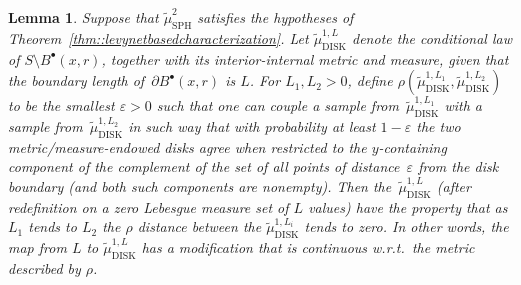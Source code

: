 \documentclass[10pt]{amsart}
\newcommand{\sbullet}{{\scriptscriptstyle\bullet}}
\let\epsilon\varepsilon
\theoremstyle{plain}
\numberwithin{theorem}{section}
\newtheorem{lemma}[theorem]{Lemma}
\theoremstyle{definition}
\newcommand{\tmustwo}{\wt{\mu}_{\mathrm{SPH}}^2}
\newcommand{\tmudonel}{\wt{\mu}_{ \mathrm{DISK}}^{1, L}}
\def\tmudonelset#1{\wt{\mu}_{ \mathrm{DISK}}^{1, #1}}
\let\wt\widetilde
\newcommand{\fb}[2]{B^\sbullet(#1,#2)}
\begin{document}
\begin{lemma}
\label{lem::disklawcontinuity}
Suppose that $\tmustwo$ satisfies the hypotheses of Theorem~\ref{thm::levynetbasedcharacterization}. Let $\tmudonel$ denote the conditional law of $S \setminus \fb{x}{r}$, together with its interior-internal metric and measure, given that the boundary length of~$\partial \fb{x}{r}$ is $L$. For $L_1,L_2 > 0$, define $\rho(\tmudonelset{L_1}, \tmudonelset{L_2})$ to be the smallest $\epsilon > 0$ such that one can couple a sample from~$\tmudonelset{L_1}$ with a sample from~$\tmudonelset{L_2}$ in such way that with probability at least $1-\epsilon$ the two metric/measure-endowed disks agree when restricted to the $y$-containing component of the complement of the set of all points of distance~$\epsilon$ from the disk boundary (and both such components are nonempty). Then the~$\tmudonel$ (after redefinition on a zero Lebesgue measure set of $L$ values) have the property that as $L_1$ tends to $L_2$ the $\rho$ distance between the $\tmudonelset{L_i}$ tends to zero. In other words, the map from $L$ to $\tmudonel$ has a modification that is continuous w.r.t.\ the metric described by $\rho$.
\end{lemma}
\end{document}
